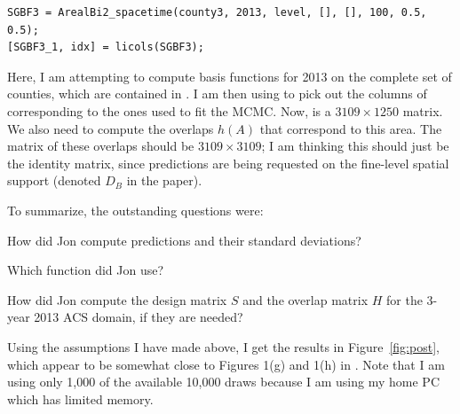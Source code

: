 \documentclass[10pt]{article}
\begin{document}
%
\begin{lstlisting}
SGBF3 = ArealBi2_spacetime(county3, 2013, level, [], [], 100, 0.5, 0.5);
[SGBF3_1, idx] = licols(SGBF3);
\end{lstlisting}
%
Here, I am attempting to compute basis functions for 2013 on the complete set of counties, which are contained in . I am then using  to pick out the columns of  corresponding to the ones used to fit the MCMC. Now,  is a $3109 \times 1250$ matrix. We also need to compute the overlaps $h(A)$ that correspond to this area. The matrix  of these overlaps should be  $3109 \times 3109$; I am thinking this should just be the identity matrix, since predictions are being requested on the fine-level spatial support (denoted $D_B$ in the paper).

\vspace{0.5em}
\noindent
To summarize, the outstanding questions were:
%
\begin{enumerate*}
\item How did Jon compute predictions and their standard deviations?
\item Which  function did Jon use?
\item How did Jon compute the design matrix $S$ and the overlap matrix $H$ for the 3-year 2013 ACS domain, if they are needed?
\end{enumerate*}
%
Using the assumptions I have made above, I get the results in Figure~\ref{fig:post}, which appear to be somewhat close to Figures 1(g) and 1(h) in \citet{BradleyEtAl2016-STAT}. Note that I am using only 1,000 of the available 10,000 draws because I am using my home PC which has limited memory.
\end{document}
